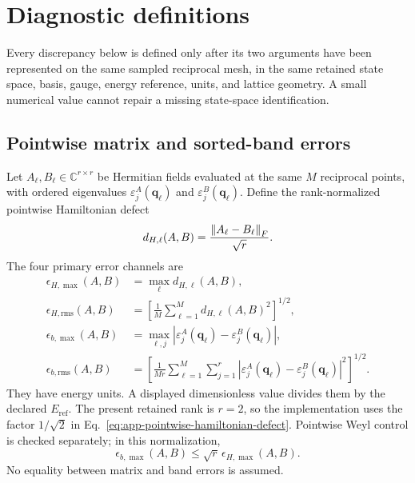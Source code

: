 \section{Diagnostic definitions}
\label{app:diagnostics}

Every discrepancy below is defined only after its two arguments have been represented on
the same sampled reciprocal mesh, in the same retained state space, basis, gauge, energy
reference, units, and lattice geometry. A small numerical value cannot repair a missing
state-space identification.

\subsection{Pointwise matrix and sorted-band errors}

Let $A_\ell,B_\ell\in\mathbb C^{r\times r}$ be Hermitian fields evaluated at the same
$M$ reciprocal points, with ordered eigenvalues
$\varepsilon_j^A(\mathbf q_\ell)$ and
$\varepsilon_j^B(\mathbf q_\ell)$. Define the rank-normalized pointwise Hamiltonian
defect
\begin{equation}
 d_{H,\ell}(A,B)=\frac{\left\lVert A_\ell-B_\ell\right\rVert_F}{\sqrt r}.
 \label{eq:app-pointwise-hamiltonian-defect}
\end{equation}
The four primary error channels are
\begin{align}
 \epsilon_{H,\max}(A,B)&=\max_\ell d_{H,\ell}(A,B),\\
 \epsilon_{H,\mathrm{rms}}(A,B)
 &=\left[\frac1M\sum_{\ell=1}^M d_{H,\ell}(A,B)^2\right]^{1/2},\\
 \epsilon_{b,\max}(A,B)
 &=\max_{\ell,j}\left|\varepsilon_j^A(\mathbf q_\ell)
                   -\varepsilon_j^B(\mathbf q_\ell)\right|,\\
 \epsilon_{b,\mathrm{rms}}(A,B)
 &=\left[\frac1{Mr}\sum_{\ell=1}^M\sum_{j=1}^r
  \left|\varepsilon_j^A(\mathbf q_\ell)
       -\varepsilon_j^B(\mathbf q_\ell)\right|^2\right]^{1/2}.
 \label{eq:app-primary-error-channels}
\end{align}
They have energy units. A displayed dimensionless value divides them by the declared
$E_{\mathrm{ref}}$. The present retained rank is $r=2$, so the implementation uses the
factor $1/\sqrt2$ in Eq.~\eqref{eq:app-pointwise-hamiltonian-defect}. Pointwise Weyl
control is checked separately; in this normalization,
\begin{equation}
 \epsilon_{b,\max}(A,B)\le
 \sqrt r\,\epsilon_{H,\max}(A,B).
 \label{eq:app-weyl-check}
\end{equation}
No equality between matrix and band errors is assumed.

